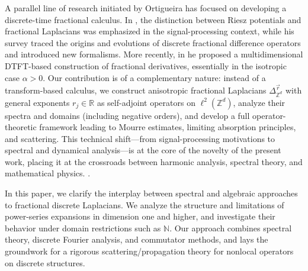 \documentclass[10pt]{amsart} %
\newcommand{\R}{{\mathbb{R}}}
\newcommand{\Z}{{\mathbb{Z}}}
\newcommand{\N}{{\mathbb{N}}}
\newcommand{\1}{{\mathbb{I}}}
\numberwithin{equation}{section}
\begin{document}
\smallskip
A parallel line of research initiated by Ortigueira has focused on developing a
discrete-time fractional calculus. In \cite{Or}, the distinction between
Riesz potentials and fractional Laplacians was emphasized in the signal-processing
context, while his survey \cite{Ortigueira2014Riesz} traced the origins and evolutions
of discrete fractional difference operators and introduced new formalisms. More
recently, in \cite{Ortigueira_MD_DMDTFT_2024} he proposed a multidimensional
DTFT-based construction of fractional derivatives, essentially in the isotropic case
$\alpha>0$. Our contribution is of a complementary nature: instead of a
transform-based calculus, we construct anisotropic fractional Laplacians
$\Delta_{\Z^d}^{\vec r}$ with general exponents $r_j\in\R$ as self-adjoint operators
on $\ell^2(\Z^d)$, analyze their spectra and domains (including negative orders), and
develop a full operator-theoretic framework leading to Mourre estimates, limiting
absorption principles, and scattering. This technical shift---from signal-processing
motivations to spectral and dynamical analysis---is at the core of the novelty of the
present work, placing it at the crossroads between harmonic analysis, spectral theory,
and mathematical physics.
.

\smallskip

In this paper, we clarify the interplay between spectral and algebraic approaches to fractional discrete Laplacians.
We analyze the structure and limitations of power-series expansions in dimension one and higher,
and investigate their behavior under domain restrictions such as $\N$.
Our approach combines spectral theory, discrete Fourier analysis, and commutator methods,
and lays the groundwork for a rigorous scattering/propagation theory for nonlocal operators on discrete structures.
\end{document}
